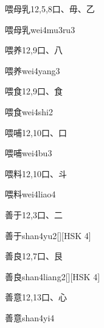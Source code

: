 \begin{entry}{喂母乳}{12,5,8}{⼝、⽏、⼄}
  \begin{phonetics}{喂母乳}{wei4mu3ru3}
  \end{phonetics}
\end{entry}

\begin{entry}{喂养}{12,9}{⼝、⼋}
  \begin{phonetics}{喂养}{wei4yang3}
  \end{phonetics}
\end{entry}

\begin{entry}{喂食}{12,9}{⼝、⾷}
  \begin{phonetics}{喂食}{wei4shi2}
  \end{phonetics}
\end{entry}

\begin{entry}{喂哺}{12,10}{⼝、⼝}
  \begin{phonetics}{喂哺}{wei4bu3}
  \end{phonetics}
\end{entry}

\begin{entry}{喂料}{12,10}{⼝、⽃}
  \begin{phonetics}{喂料}{wei4liao4}
  \end{phonetics}
\end{entry}

\begin{entry}{善于}{12,3}{⼝、⼆}
  \begin{phonetics}{善于}{shan4yu2}[][HSK 4]
  \end{phonetics}
\end{entry}

\begin{entry}{善良}{12,7}{⼝、⾉}
  \begin{phonetics}{善良}{shan4liang2}[][HSK 4]
  \end{phonetics}
\end{entry}

\begin{entry}{善意}{12,13}{⼝、⼼}
  \begin{phonetics}{善意}{shan4yi4}
  \end{phonetics}
\end{entry}

